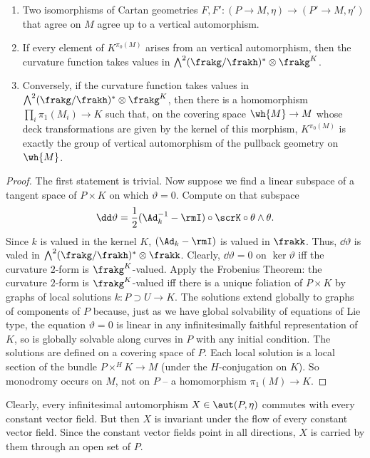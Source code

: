 \begin{cor}
    \begin{enumerate}
        \item Two isomorphisms of Cartan geometries $F,F':(P\to M,\eta)\to (P'\to M,\eta')$ that agree on $M$ agree up to a vertical automorphism.
        \item If every element of $K^{\pi_0(M)}$ arises from an vertical automorphism, then the curvature function takes values in $\bigwedge^2(\frakg\slash\frakh)^\ast\otimes\frakg^K$.
        \item Conversely, if the curvature function takes values in $\bigwedge^2(\frakg\slash\frakh)^\ast\otimes\frakg^K$, then there is a homomorphism $\prod_i \pi_1(M_i)\to K$ such that, on the covering space $\wh{M}\to M$ whose deck transformations are given by the kernel of this morphism, $K^{\pi_0(M)}$ is exactly the group of vertical automorphism of the pullback geometry on $\wh{M}$.
    \end{enumerate}
\end{cor}
\begin{proof}
    The first statement is trivial. Now suppose we find a linear subspace of a tangent space of $P\times K $  on which $\vartheta=0$. Compute on that subspace 
    \[\dd\vartheta=\frac12(\Ad_k^{-1}-\rmI)\circ \scrK\circ \theta\wedge\theta.\]
    Since $k$ is valued in the kernel $K$, $(\Ad_k-\rmI)$ is valued in $\frakk$. Thus, $\dd\vartheta$ is valed in $\bigwedge^2(\frakg\slash\frakh)^\ast\otimes\frakk$. Clearly, $\dd\vartheta=0$ on $\ker\vartheta$ iff the curvature $2$-form is $\frakg^K$-valued. Apply the Frobenius Theorem: the curvature $2$-form is $\frakg^K$-valued iff there is a unique foliation of $P\times K$ by graphs of local solutions $k:P\supset U\to K$. The solutions extend globally to graphs of components of $P$ because, just as we have global solvability of equations of Lie type, the equation $\vartheta=0$ is linear in any infinitesimally faithful representation of $K$, so is globally solvable along curves in $P$ with any initial condition. The solutions are defined on a covering space of $P$. Each local solution is a local section of the bundle $P\times^H K\to M$ (under the $H$-conjugation on $K$). So monodromy occurs on $M$, not on $P$ --  a homomorphism $\pi_1(M)\to K$.
\end{proof}

Clearly, every infinitesimal automorphism $X\in\aut(P,\eta)$ commutes with every constant vector field. But then $X$ is invariant under the flow of every constant vector field. Since the constant vector fields point in all directions, $X$ is carried by them through an open set of $P$.

